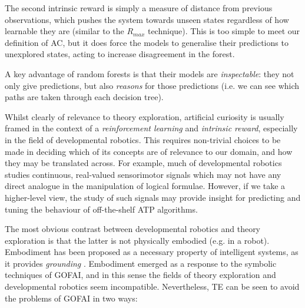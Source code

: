 The second intrinsic reward is simply a measure of distance from previous observations, which pushes the system towards unseen states regardless of how learnable they are (similar to the $R_{max}$ technique). This is too simple to meet our definition of AC, but it does force the models to generalise their predictions to unexplored states, acting to increase disagreement in the forest.

A key advantage of random forests is that their models are \emph{inspectable}: they not only give predictions, but also \emph{reasons} for those predictions (i.e. we can see which paths are taken through each decision tree). %

\citep{Kaplan2006}
\citep{Lipson2007}
\citep{Luciw2011}
\citep{Macedo2000}
\citep{Ramik.Sabourin.Madani:2013}
\citep{Roa.Kruijff.Jacobsson:2009}
\citep{Schaul.Sun.Wierstra.ea:2011}
\citep{Schmidhuber1999}
\citep{Schmidhuber:1991}
\citep{Scott1989}
\citep{Steunebrink.Koutnik.Thorisson.ea:2013}
\citep{maher2008achieving}
\citep{meyer1991possibility}
\citep{oudeyer2004intelligent}
\citep{oudeyer2014evolution}
\citep{schmidhuber2006developmental}


Whilst clearly of relevance to theory exploration, artificial curiosity is usually framed in the context of a \emph{reinforcement learning} and \emph{intrinsic reward}, especially in the field of developmental robotics. This requires non-trivial choices to be made in deciding which of its concepts are of relevance to our domain, and how they may be translated across. For example, much of developmental robotics studies continuous, real-valued sensorimotor signals which may not have any direct analogue in the manipulation of logical formulae. However, if we take a higher-level view, the study of such signals may provide insight for predicting and tuning the behaviour of off-the-shelf ATP algorithms.

The most obvious contrast between developmental robotics and theory exploration is that the latter is not physically embodied (e.g. in a robot). Embodiment has been proposed as a necessary property of intelligent systems, as it provides \emph{grounding} \citep{anderson2003embodied}. Embodiment emerged as a response to the symbolic techniques of GOFAI, and in this sense the fields of theory exploration and developmental robotics seem incompatible. Nevertheless, TE can be seen to avoid the problems of GOFAI in two ways:

